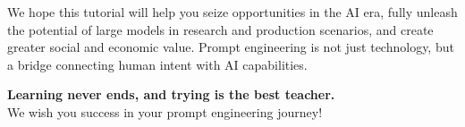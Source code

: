 \documentclass[12pt]{article}
\begin{document}
We hope this tutorial will help you seize opportunities in the AI era, fully unleash the potential of large models in research and production scenarios, and create greater social and economic value. Prompt engineering is not just technology, but a bridge connecting human intent with AI capabilities.

\begin{center}
\textbf{Learning never ends, and trying is the best teacher.}\\
We wish you success in your prompt engineering journey!
\end{center}
\end{document}
